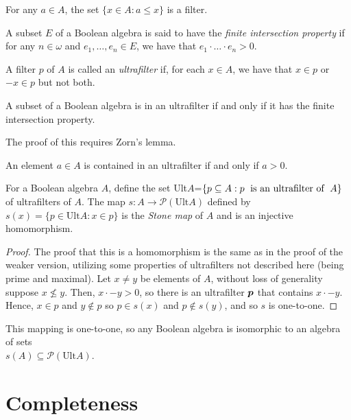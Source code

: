 \documentclass[12pt]{article}
\begin{document}
\begin{example}
For any $a\in A$, the set $\{x\in A: a\le x\}$ is a filter.
\end{example}

\begin{definition}
A subset $E$ of a Boolean algebra is said to have the \textit{finite intersection property} if for any $n\in\omega$ and $e_1,\dots,e_n\in E$, we have that $e_1\cdot\ldots\cdot e_n>0$.
\end{definition}

\begin{definition}
A filter $p$ of $A$ is called an \textit{ultrafilter} if, for each $x\in A$, we have that $x\in p$ or $-x\in p$ but not both.
\end{definition}

\begin{theorem}
A subset of a Boolean algebra is in an ultrafilter if and only if it has the finite intersection property.
\end{theorem}

The proof of this requires Zorn's lemma.

\begin{lemma}
An element $a\in A$ is contained in an ultrafilter if and only if $a>0$.
\end{lemma}

\begin{theorem}
For a Boolean algebra $A$, define the set Ult$A$=$\{p\subseteq A: p \text{\; is an ultrafilter of \;} A\}$ of ultrafilters of $A$.
The map $s: A\to \mathcal{P}(\text{Ult}A)$ defined by $s(x)=\{p\in \text{Ult}A: x\in p\}$ is the \textit{Stone map} of $A$ and is an injective homomorphism.
\end{theorem}
\begin{proof}
The proof that this is a homomorphism is the same as in the proof of the weaker version, utilizing some properties of ultrafilters not described here (being prime and maximal).
Let $x\neq y$ be elements of $A$, without loss of generality suppose $x\not\le y$. 
Then, $x\cdot -y>0$, so there is an ultrafilter ${\boldsymbol p}$ that contains $x\cdot -y$.
Hence, $x\in p$ and $y\not\in p$ so $p\in s(x)$ and $p\not\in s(y)$, and so $s$ is one-to-one.
\end{proof}
This mapping is one-to-one, so any Boolean algebra is isomorphic to an algebra of sets \\$s(A)\subseteq \mathcal{P}(\text{Ult}A)$.

\section{Completeness}
\end{document}
